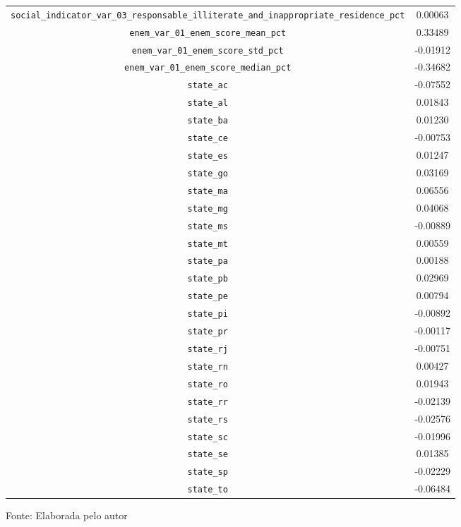 \begin{table}[h]
\begin{adjustbox}{width=\textwidth}
\begin{tabular}{cc}
\verb|social_indicator_var_03_responsable_illiterate_and_inappropriate_residence_pct| &  0.00063 \\
\verb|enem_var_01_enem_score_mean_pct| &  0.33489 \\
\verb|enem_var_01_enem_score_std_pct|  & -0.01912 \\
\verb|enem_var_01_enem_score_median_pct|  & -0.34682 \\
\verb|state_ac|  & -0.07552 \\
\verb|state_al| &  0.01843 \\
\verb|state_ba| &  0.01230 \\
\verb|state_ce|  & -0.00753 \\
\verb|state_es| &  0.01247 \\
\verb|state_go| &  0.03169 \\
\verb|state_ma| &  0.06556 \\
\verb|state_mg| &  0.04068 \\
\verb|state_ms|  & -0.00889 \\
\verb|state_mt| &  0.00559 \\
\verb|state_pa| &  0.00188 \\
\verb|state_pb| &  0.02969 \\
\verb|state_pe| &  0.00794 \\
\verb|state_pi|  & -0.00892 \\
\verb|state_pr|  & -0.00117 \\
\verb|state_rj|  & -0.00751 \\
\verb|state_rn| &  0.00427 \\
\verb|state_ro| &  0.01943 \\
\verb|state_rr|  & -0.02139 \\
\verb|state_rs|  & -0.02576 \\
\verb|state_sc|  & -0.01996 \\
\verb|state_se| &  0.01385 \\
\verb|state_sp|  & -0.02229 \\
\verb|state_to|  & -0.06484 \\
\hline
\end{tabular}

\end{adjustbox}

Fonte: Elaborada pelo autor
\end{table}
